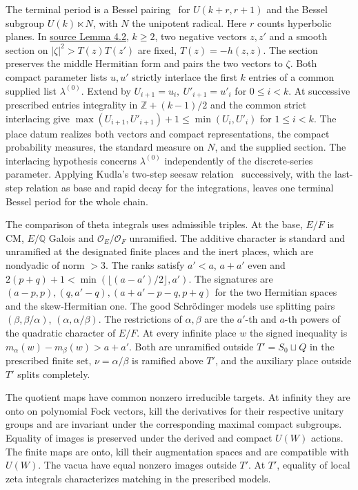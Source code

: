 \documentclass[letterpaper,11pt]{article}
\newcommand{\QQ}{\mathbb Q}
\newcommand{\ZZ}{\mathbb Z}
\newcommand{\paperpage}[2]{\href{https://zenodo.org/records/24413008/files/alpoge-rh-exposition.pdf\#page=#1}{#2}}
\begin{document}
The terminal period is a Bessel pairing~\cite{ggp} for \(U(k+r,r+1)\) and the Bessel subgroup \(U(k)\ltimes N\), with \(N\) the unipotent radical. Here \(r\) counts hyperbolic planes. In \paperpage{13}{source Lemma 4.2}, \(k\ge2\), two negative vectors \(z,z'\) and a smooth section on \(|\zeta|^2>T(z)T(z')\) are fixed, \(T(z)=-h(z,z)\). The section preserves the middle Hermitian form and pairs the two vectors to \(\zeta\). Both compact parameter lists \(u,u'\) strictly interlace the first \(k\) entries of a common supplied list \(\lambda^{(0)}\). Extend by \(U_{i+1}=u_i,\ U'_{i+1}=u'_i\) for \(0\le i<k\). At successive prescribed entries integrality in \(\ZZ+(k-1)/2\) and the common strict interlacing give \(\max(U_{i+1},U'_{i+1})+1\le\min(U_i,U'_i)\) for \(1\le i<k\). The place datum realizes both vectors and compact representations, the compact probability measures, the standard measure on \(N\), and the supplied section. The interlacing hypothesis concerns \(\lambda^{(0)}\) independently of the discrete-series parameter. Applying Kudla's two-step seesaw relation~\cite{seesaw} successively, with the last-step relation as base and rapid decay for the integrations, leaves one terminal Bessel period for the whole chain.

The comparison of theta integrals uses admissible triples. At the base, \(E/F\) is CM, \(E/\QQ\) Galois and \(\mathcal O_E/\mathcal O_F\) unramified. The additive character is standard and unramified at the designated finite places and the inert places, which are nondyadic of norm \(>3\). The ranks satisfy \(a'<a\), \(a+a'\) even and \(2(p+q)+1<\min(\lfloor(a-a')/2\rfloor,a')\). The signatures are \((a-p,p),(q,a'-q),(a+a'-p-q,p+q)\) for the two Hermitian spaces and the skew-Hermitian one. The good Schr\"odinger models use splitting pairs \((\beta,\beta/\alpha)\), \((\alpha,\alpha/\beta)\). The restrictions of \(\alpha,\beta\) are the \(a'\)-th and \(a\)-th powers of the quadratic character of \(E/F\). At every infinite place \(w\) the signed inequality is \(m_\alpha(w)-m_\beta(w)>a+a'\). Both are unramified outside \(T'=S_0\sqcup Q\) in the prescribed finite set, \(\nu=\alpha/\beta\) is ramified above \(T'\), and the auxiliary place outside \(T'\) splits completely.

The quotient maps have common nonzero irreducible targets. At infinity they are onto on polynomial Fock vectors, kill the derivatives for their respective unitary groups and are invariant under the corresponding maximal compact subgroups. Equality of images is preserved under the derived and compact \(U(W)\) actions. The finite maps are onto, kill their augmentation spaces and are compatible with \(U(W)\). The vacua have equal nonzero images outside \(T'\). At \(T'\), equality of local zeta integrals characterizes matching in the prescribed models.
\end{document}

